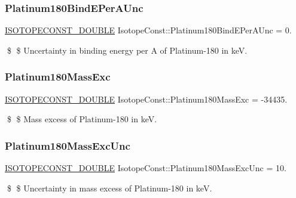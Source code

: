 \subsubsection{\texorpdfstring{Platinum180\+Bind\+E\+Per\+A\+Unc}{Platinum180BindEPerAUnc}}
{\footnotesize\ttfamily \mbox{\hyperlink{group___isotope_const-_macros_ga8f45a7272ce02c0b4c65c44636ed719a}{I\+S\+O\+T\+O\+P\+E\+C\+O\+N\+S\+T\+\_\+\+D\+O\+U\+B\+LE}} Isotope\+Const\+::\+Platinum180\+Bind\+E\+Per\+A\+Unc = 0.}

\$ \$ Uncertainty in binding energy per A of Platinum-\/180 in keV. \mbox{\label{group___isotope_const-_platinum-_pt180_gaab2fe62e9a671da418b91487225f8993}} 
\subsubsection{\texorpdfstring{Platinum180\+Mass\+Exc}{Platinum180MassExc}}
{\footnotesize\ttfamily \mbox{\hyperlink{group___isotope_const-_macros_ga8f45a7272ce02c0b4c65c44636ed719a}{I\+S\+O\+T\+O\+P\+E\+C\+O\+N\+S\+T\+\_\+\+D\+O\+U\+B\+LE}} Isotope\+Const\+::\+Platinum180\+Mass\+Exc = -\/34435.}

\$ \$ Mass excess of Platinum-\/180 in keV. \mbox{\label{group___isotope_const-_platinum-_pt180_ga537142d28688f0926a569ecf75a6e1c2}} 
\subsubsection{\texorpdfstring{Platinum180\+Mass\+Exc\+Unc}{Platinum180MassExcUnc}}
{\footnotesize\ttfamily \mbox{\hyperlink{group___isotope_const-_macros_ga8f45a7272ce02c0b4c65c44636ed719a}{I\+S\+O\+T\+O\+P\+E\+C\+O\+N\+S\+T\+\_\+\+D\+O\+U\+B\+LE}} Isotope\+Const\+::\+Platinum180\+Mass\+Exc\+Unc = 10.}

\$ \$ Uncertainty in mass excess of Platinum-\/180 in keV. \mbox{\label{group___isotope_const-_platinum-_pt180_gae7256b35cf23268e8aede6d1fcbbb833}} 
